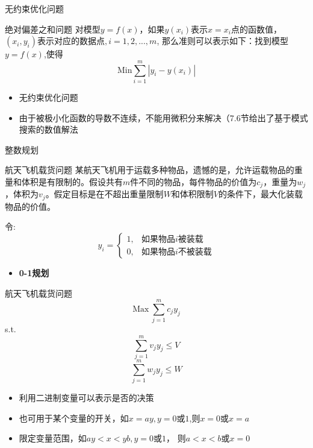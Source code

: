 \documentclass[mathserif, table]{beamer}
\begin{document}
\begin{frame}{无约束优化问题}
  \begin{block}{绝对偏差之和问题}
    对模型$y=f(x)$，如果$y(x_i)$表示$x=x_i$点的函数值， $(x_i, y_i)表示对应的数据点, i=1, 2, ..., m$, 那么准则可以表示如下：找到模型$y=f(x)$,使得
    \[
    \mbox{Min} \sum_{i=1}^m |y_i - y(x_i)|
    \]
  \end{block}

  \begin{itemize}
  \item 无约束优化问题
  \item 由于被极小化函数的导数不连续，不能用微积分来解决（7.6节给出了基于模式搜索的数值解法
  \end{itemize}
  
\end{frame}

\begin{frame}{整数规划}
  \begin{block}{航天飞机载货问题}
    某航天飞机用于运载多种物品，遗憾的是，允许运载物品的重量和体积是有限制的。假设共有$m$件不同的物品，每件物品的价值为$c_j$，重量为$w_j$，体积为$v_j$。假定目标是在不超出重量限制$W$和体积限制$V$的条件下，最大化装载物品的价值。
  \end{block}
  令:
  \[
  y_i = \left\{
    \begin{array}{ll}
      1, & \text{如果物品$i$被装载}\\
      0, & \text{如果物品$i$不被装载}
    \end{array}
  \right.
  \]

  \begin{itemize}
  \item \textbf{0-1规划}
  \end{itemize}
\end{frame}

\begin{frame}{航天飞机载货问题}
  \[
  \mbox{Max}\ \sum_{j=1}^m c_jy_j
  \]
  s.t.
  \[
  \sum_{j=1}^m v_jy_j \le V
  \]
  \[
  \sum_{j=1}^m w_jy_j \le W
  \]

  \begin{itemize}
  \item 利用二进制变量可以表示是否的决策
  \item 也可用于某个变量的开关，如$x=ay, y=0\text{或}1$,则$x=0$或$x=a$
  \item 限定变量范围，如$ay < x < yb, y=0\text{或}1$， 则$a<x<b$或$x=0$
  \end{itemize}
  
\end{frame}
\end{document}
